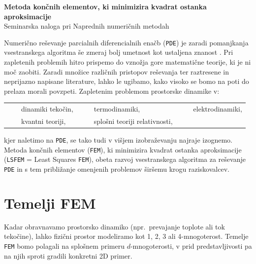\documentclass[11pt,a4paper,notitlepage]{article}%
\newcommand{\tabitem}{~~\llap{\textbullet}~~}
\begin{document}


	\begin{center}
		\textbf{\LARGE{Metoda končnih elementov, ki minimizira kvadrat ostanka aproksimacije}}\\[0.25cm]
		\large{Seminarska naloga pri Naprednih numeričnih metodah}\\[0.7cm]
	\end{center}




	
	Numerično reševanje parcialnih diferencialnih enačb (\texttt{PDE}) je zaradi pomanjkanja vsestranskega algoritma še zmeraj bolj umetnost kot ustaljena znanost \cite{JiangB-LSFEM}. Pri zapletenih problemih hitro prispemo do vznožja gore matematične teorije, ki je ni moč zaobiti. Zaradi množice različnih pristopov reševanja ter raztresene in neprijazno napisane literature, lahko le ugibamo, kako visoko se bomo na poti do prelaza morali povzpeti. Zapletenim problemom prostorske dinamike v:
	\begin{center}
		\begin{tabular}[h]{lll}
			\tabitem dinamiki tekočin,\hspace{1cm}	&	\tabitem termodinamiki,\hspace{2.5cm}	&	\tabitem elektrodinamiki,\\
			\tabitem kvantni teoriji,	&	\tabitem splošni teoriji relativnosti,&	\\
		\end{tabular}
	\end{center}
	kjer naletimo na \texttt{PDE}, se tako tudi v višjem izobraževanju najraje izognemo. Metoda končnih elementov (\texttt{FEM}), ki minimizira kvadrat ostanka aproksimacije (\texttt{LSFEM} = Least Squares \texttt{FEM}), obeta razvoj vsestranskega algoritma za reševanje \texttt{PDE} in s tem približanje omenjenih problemov širšemu krogu raziskovalcev.
	
	\section{Temelji FEM}
	Kadar obravnavamo prostorsko dinamiko (npr.\ prevajanje toplote ali tok tekočine), lahko fizični prostor modeliramo kot 1, 2, 3 ali 4-mnogoterost. Temelje \texttt{FEM} bomo polagali na splošnem primeru $d$-mnogoterosti, v prid predstavljivosti pa na njih sproti gradili konkretni 2D primer.
	
\end{document}
